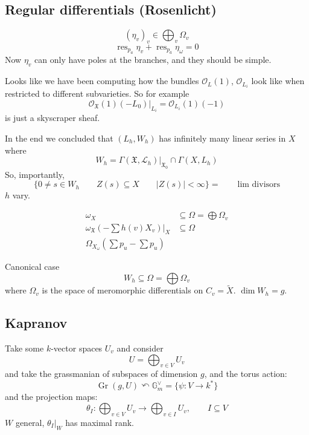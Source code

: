 \subsection{Regular differentials (Rosenlicht)}

\[(\eta_v)_{v}\in\bigoplus_{v}\Omega_v  \]
\[\operatorname{res}_{p_a}\eta_v+\operatorname{res}_{p_{\bar{a}}}\eta_\omega =0\]
Now $\eta_v$ can only have poles at the branches, and they should be simple.

\begin{remark}
	Looks like we have been computing how the bundles $\mathcal{O}_L(1)$, $\mathcal{O}_{L_i}$ look like when restricted to different subvarieties. So for example
\[\mathcal{O}_{\mathfrak{X}}(1)(-L_0)|_{L_i}=\mathcal{O}_{L_i}(1)(-1)\]
	is just a skyscraper sheaf.
\end{remark}

In the end we concluded that $(L_h,W_h)$ has infinitely many linear series in $X$ where
\[W_h= \Gamma(\mathfrak{X},\mathcal{L}_{h})\Big|_{\mathfrak{X}_0}\cap \Gamma(X,L_h)\]
So, importantly,
\[\{0\neq  s\in W_h\qquad Z(s)\subseteq X\qquad |Z(s)| <\infty\} =\qquad \text{lim divisors} \]
$h$ vary.

\begin{align*}
	\omega_X&\subseteq \Omega =\bigoplus\Omega_v\\
	\omega_{\mathfrak{X}}\left( -\sum h(v)X_{v} \right) \Big|_{X}&\subseteq \Omega \\
	\Omega_{X_{ \omega}}\left( \sum p_u-\sum p_u \right) 
\end{align*}

\begin{thing6}{Canonical case}\leavevmode
	\[W_h\subseteq \Omega =\bigoplus\Omega_v  \]
	where $\Omega_v$ is the space of meromorphic differentials on $C_v=\tilde{X}$. $\dim W_h=g$.
\end{thing6}

\subsection{Kapranov}
Take some $k$-vector spaces $U_v$ and consider
 \[U=\bigoplus_{v\in V} U_v \]
 and take the grassmanian of subspaces of dimension $g$, and the torus action:
 \[\operatorname{Gr}(g,U)\curvearrowleft  \mathbb{G}^\vee_m=\{\psi:V\to k^*\} \]
 and the projection maps:
 \[\theta_I:\bigoplus_{v\in V} U_v\longrightarrow \bigoplus_{v\in I} U_v,\qquad I\subseteq V  \]
$W$ general, $\theta_I\Big|_{W}$ has maximal rank.

